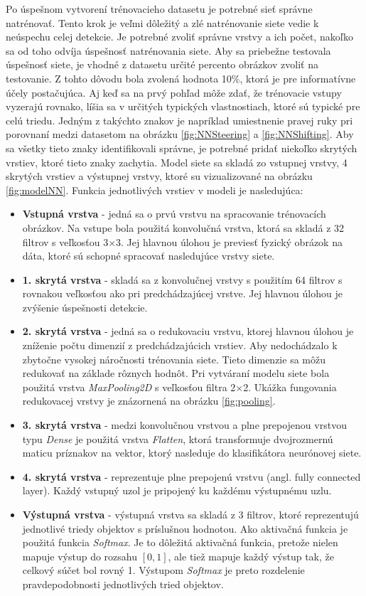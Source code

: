 \documentclass[slovak,master,dept460,male,cpp,cpdeclaration]{diploma}
\begin{document}
\newpage
Po úspešnom vytvorení trénovacieho datasetu je potrebné  sieť správne natrénovať. Tento krok je  veľmi dôležitý a zlé natrénovanie siete vedie k  neúspechu celej detekcie. Je potrebné zvoliť správne vrstvy a ich počet, nakoľko sa  od toho odvíja úspešnosť natrénovania siete. Aby sa priebežne testovala úspešnosť siete, je vhodné  z datasetu určité percento  obrázkov zvoliť na testovanie. Z tohto dôvodu bola zvolená hodnota 10\%, ktorá je pre informatívne účely postačujúca. Aj keď sa na prvý pohľad môže zdať, že trénovacie vstupy vyzerajú rovnako, líšia sa v určitých typických vlastnostiach, ktoré sú typické pre celú triedu. Jedným z takýchto znakov je napríklad umiestnenie pravej ruky pri porovnaní  medzi datasetom na obrázku \ref{fig:NNSteering} a \ref{fig:NNShifting}. Aby sa všetky tieto znaky identifikovali správne, je potrebné pridať niekoľko skrytých vrstiev, ktoré tieto znaky zachytia. Model siete sa skladá zo vstupnej vrstvy, 4 skrytých vrstiev a výstupnej vrstvy, ktoré su vizualizované na obrázku \ref{fig:modelNN}. Funkcia jednotlivých vrstiev v modeli je nasledujúca:
\begin{itemize}
\item \textbf{Vstupná vrstva} - jedná sa o prvú vrstvu na spracovanie trénovacích obrázkov. Na vstupe bola použitá konvolučná vrstva, ktorá sa skladá z 32 filtrov s veľkosťou 3$\times$3. Jej hlavnou úlohou je previesť fyzický obrázok na dáta, ktoré sú schopné spracovať nasledujúce vrstvy siete.
\item \textbf{1. skrytá vrstva}  - skladá sa z konvolučnej vrstvy s použitím 64 filtrov s rovnakou veľkosťou ako pri predchádzajúcej vrstve. Jej hlavnou úlohou je zvýšenie úspešnosti detekcie.
\item \textbf{2. skrytá vrstva} -  jedná sa o redukovaciu vrstvu, ktorej hlavnou úlohou je zníženie počtu dimenzií z predchádzajúcich vrstiev. Aby nedochádzalo k zbytočne vysokej náročnosti trénovania siete. Tieto dimenzie sa môžu redukovať na základe  rôznych hodnôt. Pri vytváraní modelu siete bola použitá vrstva \textit{MaxPooling2D} s veľkosťou filtra 2$\times$2. Ukážka fungovania redukovacej vrstvy je znázornená na obrázku \ref{fig:pooling}.
\item \textbf{3. skrytá vrstva} - medzi konvolučnou vrstvou a plne prepojenou vrstvou typu \textit{Dense} je  použitá vrstva \textit{Flatten}, ktorá transformuje dvojrozmernú maticu príznakov na vektor, ktorý nasleduje do klasifikátora neurónovej siete. 
\item \textbf{4. skrytá vrstva} - reprezentuje plne prepojenú vrstvu  (angl. fully connected layer). Každý vstupný uzol je pripojený ku každému výstupnému uzlu.
\item \textbf{Výstupná vrstva} - výstupná vrstva sa skladá z 3 filtrov, ktoré reprezentujú jednotlivé triedy objektov s príslušnou hodnotou. Ako aktivačná funkcia je použitá funkcia \textit{Softmax}. Je to dôležitá aktivačná funkcia, pretože nielen mapuje  výstup do rozsahu $[0,1]$, ale tiež mapuje každý výstup tak, že celkový súčet bol rovný 1. Výstupom \textit{Softmax} je preto rozdelenie pravdepodobnosti jednotlivých tried objektov.
\end{itemize}
\end{document}
